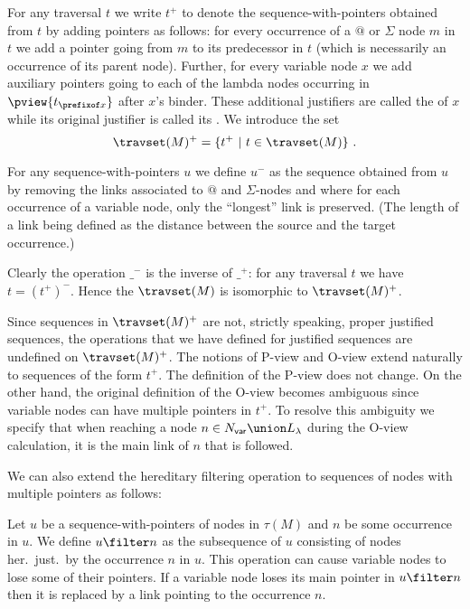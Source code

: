 For any traversal $t$ we write $t^+$ to denote the sequence-with-pointers obtained from $t$
by adding pointers as follows: for every occurrence of a $@$
or $\Sigma$ node $m$ in $t$ we add a pointer going from $m$ to its
predecessor in $t$ (which is necessarily an occurrence of its parent
node). Further, for every variable node $x$ we add auxiliary pointers going to each of the lambda nodes occurring in $\pview{t_{\prefixof x}}$
after $x$'s binder. These additional justifiers are called the  of $x$ while its original justifier is called its .
We introduce the set
$$\travset(M)^+ = \{ t^+ \ | \  t \in \travset(M) \} \ .$$

For any sequence-with-pointers $u$ we define $u^-$ as the sequence obtained from $u$ by removing the links associated to $@$ and $\Sigma$-nodes
and where for each occurrence of a variable node, only the ``longest'' link is preserved. (The length of a link being defined as the distance between the source and the target occurrence.)

Clearly the operation $\_^-$ is the inverse of $\_^+$: for any traversal $t$ we have $t= (t^+)^-$. Hence the $\travset(M)$ is isomorphic
to $\travset(M)^+$.
\bigskip


Since sequences in $\travset(M)^+$ are not, strictly speaking,
proper justified sequences, the operations that we have defined for
justified sequences are undefined on $\travset(M)^+$. The notions of P-view and O-view extend naturally to sequences of the form $t^+$. The definition of the P-view does not change. On the other hand, the original definition of the O-view becomes ambiguous since variable nodes can have multiple pointers in $t^+$. To resolve this ambiguity we specify that when reaching a node $n \in N_{\sf var} \union L_\lambda$ during the O-view calculation, it is the main link of $n$ that is followed.

We can also extend the hereditary filtering operation to sequences of nodes with multiple pointers as follows:
\begin{definition}
Let $u$ be a sequence-with-pointers of nodes in $\tau(M)$ and $n$ be some occurrence in $u$. We define $u \filter n$ as the subsequence of $u$ consisting of nodes her.\ just.\ by the occurrence $n$ in $u$.
This operation can cause variable nodes to lose some of their pointers. If a variable node loses its main pointer in $u\filter n$
then it is replaced by a link pointing to the occurrence $n$.
\end{definition}

